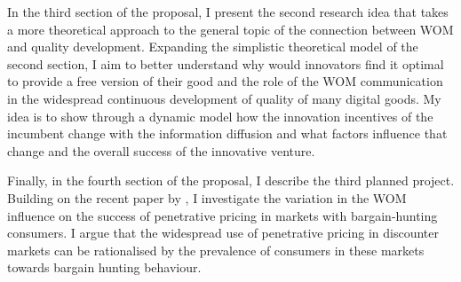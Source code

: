 \documentclass[13pt]{article}
\numberwithin{figure}{section}
\numberwithin{table}{section}
\theoremstyle{indented}
\numberwithin{equation}{section} %
\begin{document}
In the third section of the proposal, I present the second research idea that takes a more theoretical approach to the general topic of the connection between WOM and quality development. Expanding the simplistic theoretical model of the second section, I aim to better understand why would innovators find it optimal to provide a free version of their good and the role of the WOM communication in the widespread continuous development of quality of many digital goods. My idea is to show through a dynamic model how the innovation incentives of the incumbent change with the information diffusion and what factors influence that change and the overall success of the innovative venture.




Finally, in the fourth section of the proposal, I describe the third planned project. Building on the recent paper by \citet{Gentry2018}, I investigate the variation in the WOM influence on the success of  penetrative pricing in markets with bargain-hunting consumers. I argue that the widespread use of penetrative pricing in discounter markets can be rationalised by the prevalence of consumers in these markets towards bargain hunting behaviour.  


\end{document}
